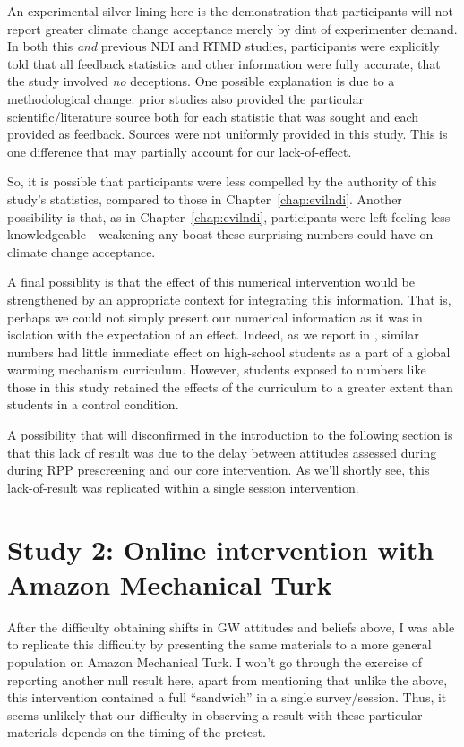 An experimental silver lining here is the demonstration that participants will
not report greater climate change acceptance merely by dint of experimenter
demand.  In both this \emph{and} previous NDI and RTMD studies, participants
were explicitly told that all feedback statistics and other information were
fully accurate, that the study involved \emph{no} deceptions.  One possible
explanation is due to a methodological change: prior studies 
also provided the particular scientific/literature source both
for each statistic that was sought and each provided as feedback.
Sources were not uniformly provided in this study. This is one
difference that may partially account for our lack-of-effect.

So, it is possible that participants were less compelled by the authority of
this study’s statistics, compared to those in Chapter~\ref{chap:evilndi}.
Another possibility is that, as in Chapter~\ref{chap:evilndi}, participants were
left feeling less knowledgeable—weakening any boost these surprising numbers
could have on climate change acceptance.  

A final possiblity is that the effect of this numerical intervention would be
strengthened by an appropriate context for integrating this information. That
is, perhaps we could not simply present our numerical information as it was in
isolation with the expectation of an effect. Indeed, as we report in
\parencite{clark_knowledge_inpress}, similar numbers had little immediate effect on
high-school students as a part of a global warming mechanism curriculum.
However, students exposed to numbers like those in this study retained the
effects of the curriculum to a greater extent than students in a control
condition.

A possibility that will disconfirmed in the introduction to the following
section is that this lack of result was due to the delay between attitudes
assessed during during RPP prescreening and our core intervention. As we'll
shortly see, this lack-of-result was replicated within a single session
intervention.

\section{Study 2: Online intervention with Amazon Mechanical Turk}
\label{sec:pro-mturk}

After the difficulty obtaining shifts in GW attitudes and beliefs above, I was
able to replicate this difficulty by presenting the same materials to a more
general population on Amazon Mechanical Turk. I won't go through the
exercise of reporting another null result here, apart from mentioning that
unlike the above, this intervention contained a full “sandwich” in a single
survey/session. Thus, it seems unlikely that our difficulty in observing a
result with these particular materials depends on the timing of the pretest.

